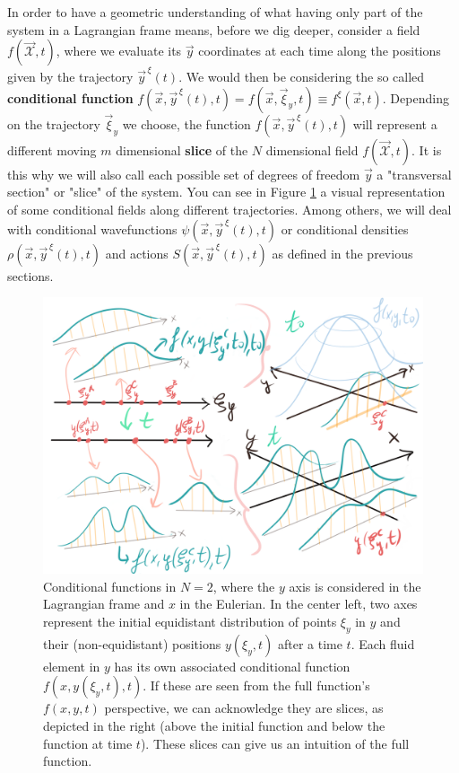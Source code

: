 \documentclass[11pt, a4paper]{article} %
\newcommand{\x}{\mathcal{X}}
\begin{document}
In order to have a geometric understanding of what having only part of the system in a Lagrangian frame means, before we dig deeper, consider a field $f(\vec{\x},t)$, where we evaluate its $\vec{y}$ coordinates at each time along the positions given by the trajectory $\vec{y}^{\, \xi}(t)$. We would then be considering the so called {\bf conditional function} $f(\vec{x}, \vec{y}^{\, \xi}(t),t)=f(\vec{x}, \vec{\xi}_y,t)\equiv f^\xi(\vec{x},t)$. Depending on the trajectory $\vec{\xi}_y$ we choose, the function $f(\vec{x}, \vec{y}^{\, \xi}(t),t)$ will represent a different moving   $m$ dimensional {\bf slice} of the $N$ dimensional field $f(\vec{\x},t)$. It is this why we will also call each possible set of degrees of freedom $\vec{y}$ a "transversal section" or "slice" of the system. You can see in Figure \ref{fig:slices} a visual representation of some conditional fields along different trajectories. Among others, we will deal with conditional wavefunctions $\psi(\vec{x}, \vec{y}^{\, \xi}(t),t)$ or conditional densities $\rho(\vec{x}, \vec{y}^{\, \xi}(t),t)$ and actions $S(\vec{x}, \vec{y}^{\, \xi}(t),t)$ as defined in the previous sections.\vspace{-0.3cm}


\begin{figure}[h!]
  \centering
    \includegraphics[width=0.70\linewidth]{6slices_1d.png}
  \caption{Conditional functions in $N=2$, where the $y$ axis is considered in the Lagrangian frame and $x$ in the Eulerian. In the center left, two axes represent the initial equidistant distribution of points $\xi_y$ in $y$ and their (non-equidistant) positions $y(\xi_y,t)$ after a time $t$. Each fluid element in $y$ has its own associated conditional function $f(x,y(\xi_y,t),t)$. If these are seen from the full function's $f(x,y,t)$ perspective, we can acknowledge they are slices, as depicted in the right (above the initial function and below the function at time $t$). These slices can give us an intuition of the full function.  }
  \label{fig:slices}
\end{figure}
\end{document}
